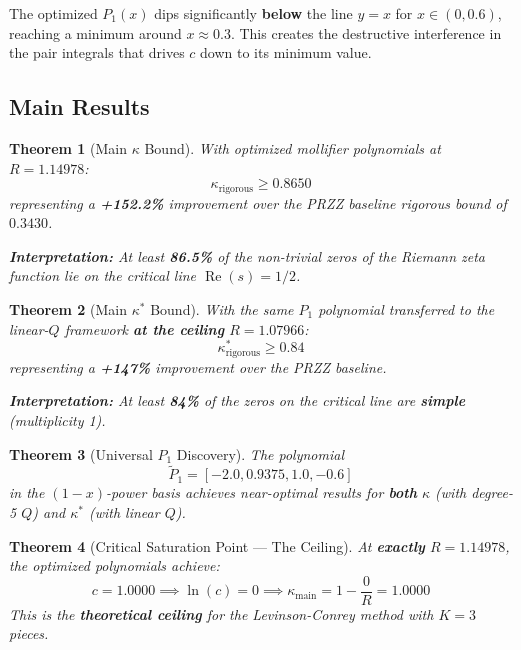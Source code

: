 \documentclass[11pt]{article}
\newtheorem{theorem}{Theorem}
\begin{document}
The optimized $P_1(x)$ dips significantly \textbf{below} the line $y = x$ for $x \in (0, 0.6)$, reaching a minimum around $x \approx 0.3$. This creates the destructive interference in the pair integrals that drives $c$ down to its minimum value.

\subsection{Main Results}

\begin{theorem}[Main $\kappa$ Bound]
With optimized mollifier polynomials at $R = 1.14978$:
\begin{equation}
\boxed{\kappa_{\text{rigorous}} \geq 0.8650}
\end{equation}
representing a \textcolor{improvement}{\textbf{+152.2\%}} improvement over the PRZZ baseline rigorous bound of $0.3430$.

\textbf{Interpretation:} At least \textbf{86.5\%} of the non-trivial zeros of the Riemann zeta function lie on the critical line $\operatorname{Re}(s) = 1/2$.
\end{theorem}

\begin{theorem}[Main $\kappa^*$ Bound]
With the same $P_1$ polynomial transferred to the linear-$Q$ framework \textbf{at the ceiling} $R = 1.07966$:
\begin{equation}
\boxed{\kappa^*_{\text{rigorous}} \geq 0.84}
\end{equation}
representing a \textcolor{improvement}{\textbf{+147\%}} improvement over the PRZZ baseline.

\textbf{Interpretation:} At least \textbf{84\%} of the zeros on the critical line are \textbf{simple} (multiplicity 1).
\end{theorem}

\begin{theorem}[Universal $P_1$ Discovery]
The polynomial
\begin{equation}
\tilde{P}_1 = [-2.0, 0.9375, 1.0, -0.6]
\end{equation}
in the $(1-x)$-power basis achieves near-optimal results for \textbf{both} $\kappa$ (with degree-5 $Q$) and $\kappa^*$ (with linear $Q$).
\end{theorem}

\begin{theorem}[Critical Saturation Point --- The Ceiling]
\label{thm:ceiling}
At \textbf{exactly} $R = 1.14978$, the optimized polynomials achieve:
\begin{equation}
\boxed{c = 1.0000 \implies \ln(c) = 0 \implies \kappa_{\text{main}} = 1 - \frac{0}{R} = 1.0000}
\end{equation}
This is the \textbf{theoretical ceiling} for the Levinson-Conrey method with $K=3$ pieces.
\end{theorem}
\end{document}
